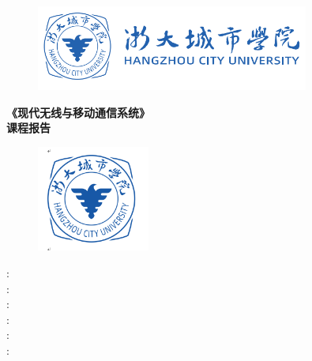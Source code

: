 \documentclass{article}
\begin{document}
\begin{figure}[h]
    \centering
    \includegraphics[width=0.8\textwidth]{./城院logo3.png}
\end{figure}
\begin{center}
    {\hwtext\bfseries\sizethirty 
    《现代无线与移动通信系统》\\[1.5\baselineskip]  %
    课程报告}
\end{center}
\begin{figure}[h]
    \centering
    \includegraphics[width=0.33\textwidth]{./城院logo2.png}
\end{figure}

\newcommand{\fssi}{\fangsong{}}

\begin{center}
{ \fssi %

:\hspace{1em}\underline{\makebox[14em][c]{\AUTHOR}}\\
\vspace{1em}
:\hspace{1em}\underline{\makebox[14em][c]{\STUDENTNO}}\\
\vspace{1em}
:\hspace{1em}\underline{}\\
\vspace{1em}
:\hspace{1em}\underline{}\\
\vspace{1em}
:\hspace{1em}\underline{}\\
\vspace{1em}
:\hspace{1em}\underline{}\\
}
\end{center}
\end{document}
